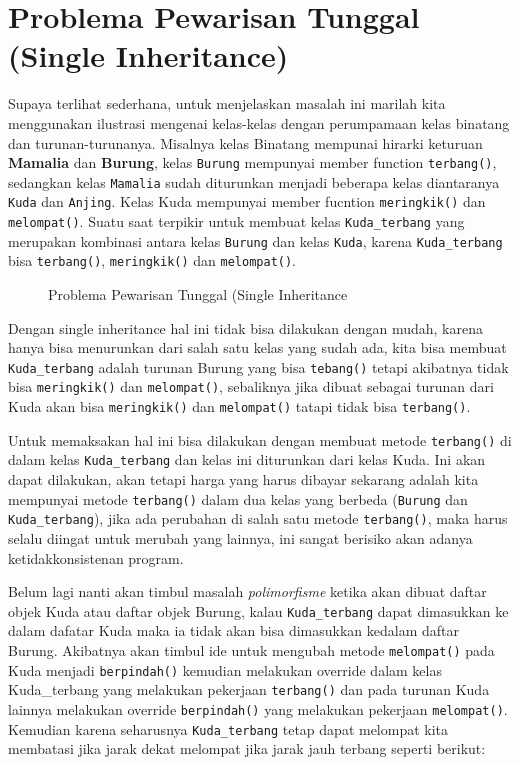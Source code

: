 \section{Problema Pewarisan Tunggal (Single Inheritance)}\label{problema-pewarisan-tunggal-single-inheritance}

Supaya terlihat sederhana, untuk menjelaskan masalah ini marilah kita
menggunakan ilustrasi mengenai kelas-kelas dengan perumpamaan kelas
binatang dan turunan-turunanya. Misalnya kelas Binatang mempunai hirarki
keturuan \textbf{Mamalia} dan \textbf{Burung}, kelas \texttt{Burung}
mempunyai member function \texttt{terbang()}, sedangkan kelas
\texttt{Mamalia} sudah diturunkan menjadi beberapa kelas diantaranya
\texttt{Kuda} dan \texttt{Anjing}. Kelas Kuda mempunyai member fucntion
\texttt{meringkik()} dan \texttt{melompat()}. Suatu saat terpikir untuk
membuat kelas \texttt{Kuda\_terbang} yang merupakan kombinasi antara
kelas \texttt{Burung} dan kelas \texttt{Kuda}, karena
\texttt{Kuda\_terbang} bisa \texttt{terbang()}, \texttt{meringkik()} dan
\texttt{melompat()}.

\begin{figure}[htbp]
\centering
{}
\caption{Problema Pewarisan Tunggal (Single Inheritance}
\end{figure}

Dengan single inheritance hal ini tidak bisa dilakukan dengan mudah,
karena hanya bisa menurunkan dari salah satu kelas yang sudah ada, kita
bisa membuat \texttt{Kuda\_terbang} adalah turunan Burung yang bisa
\texttt{tebang()} tetapi akibatnya tidak bisa \texttt{meringkik()} dan
\texttt{melompat()}, sebaliknya jika dibuat sebagai turunan dari Kuda
akan bisa \texttt{meringkik()} dan \texttt{melompat()} tatapi tidak bisa
\texttt{terbang()}.

Untuk memaksakan hal ini bisa dilakukan dengan membuat metode
\texttt{terbang()} di dalam kelas \texttt{Kuda\_terbang} dan kelas ini
diturunkan dari kelas Kuda. Ini akan dapat dilakukan, akan tetapi harga
yang harus dibayar sekarang adalah kita mempunyai metode
\texttt{terbang()} dalam dua kelas yang berbeda (\texttt{Burung} dan
\texttt{Kuda\_terbang}), jika ada perubahan di salah satu metode
\texttt{terbang()}, maka harus selalu diingat untuk merubah yang
lainnya, ini sangat berisiko akan adanya ketidakkonsistenan program.

Belum lagi nanti akan timbul masalah \emph{polimorfisme} ketika akan
dibuat daftar objek Kuda atau daftar objek Burung, kalau
\texttt{Kuda\_terbang} dapat dimasukkan ke dalam dafatar Kuda maka ia
tidak akan bisa dimasukkan kedalam daftar Burung. Akibatnya akan timbul
ide untuk mengubah metode \texttt{melompat()} pada Kuda menjadi
\texttt{berpindah()} kemudian melakukan override dalam kelas
Kuda\_terbang yang melakukan pekerjaan \texttt{terbang()} dan pada
turunan Kuda lainnya melakukan override \texttt{berpindah()} yang
melakukan pekerjaan \texttt{melompat()}. Kemudian karena seharusnya
\texttt{Kuda\_terbang} tetap dapat melompat kita membatasi jika jarak
dekat melompat jika jarak jauh terbang seperti berikut:

